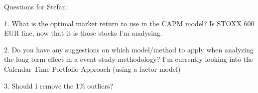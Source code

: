Questions for Stefan:

1. What is the optimal market return to use in the CAPM model? Is STOXX 600 EUR fine, now that it is those stocks I'm analysing. 

2. Do you have any suggestions on which model/method to apply when analyzing the long term effect in a event study methodology? I'm currently looking into the Calendar Time Portfolio Approach (using a factor model)

3. Should I remove the 1\% outliers?